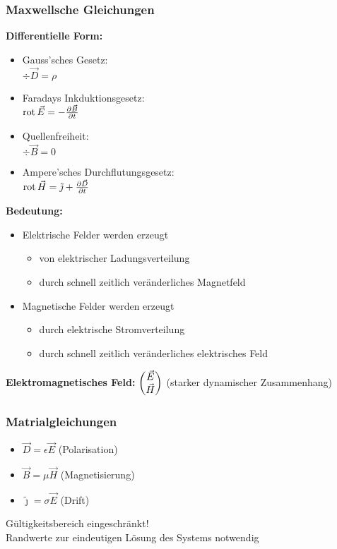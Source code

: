 \documentclass[english]{latex4ei/latex4ei_sheet}
\begin{document}
\subsubsection{Maxwellsche Gleichungen}
\textbf{Differentielle Form:}
\begin{itemize}
\item Gauss'sches Gesetz:\\$\div\vec{D}=\rho$
\item Faradays Inkduktionsgesetz:\\$\operatorname{rot} \vec{E}=-\frac{\partial \vec{B}}{\partial t}$
\item Quellenfreiheit:\\$\div\vec{B}=0$
\item Ampere'sches Durchflutungsgesetz:\\$\operatorname{rot} \vec{H}=\tilde{\jmath}+\frac{\partial \vec{D}}{\partial t}$
\end{itemize}
\textbf{Bedeutung:}
\begin{itemize}
\item Elektrische Felder werden erzeugt
\begin{itemize}
\item von elektrischer Ladungsverteilung
\item durch schnell zeitlich ver\"anderliches Magnetfeld
\end{itemize}
\item Magnetische Felder werden erzeugt
\begin{itemize}
\item durch elektrische Stromverteilung
\item durch schnell zeitlich ver\"anderliches elektrisches Feld
\end{itemize}
\end{itemize}
\textbf{Elektromagnetisches Feld:} $\begin{pmatrix} \vec{E}\\\vec{H} \end{pmatrix}$ (starker dynamischer Zusammenhang)
\subsubsection{Matrialgleichungen}
\begin{itemize}
\item $\vec{D}=\epsilon \vec{E}$ (Polarisation)
\item $\vec{B}=\mu \vec{H}$ (Magnetisierung)
\item $\tilde{\jmath}=\sigma \vec{E}$ (Drift)
\end{itemize}
G\"ultigkeitsbereich eingeschr\"ankt!\\
Randwerte zur eindeutigen L\"osung des Systems notwendig
\end{document}
